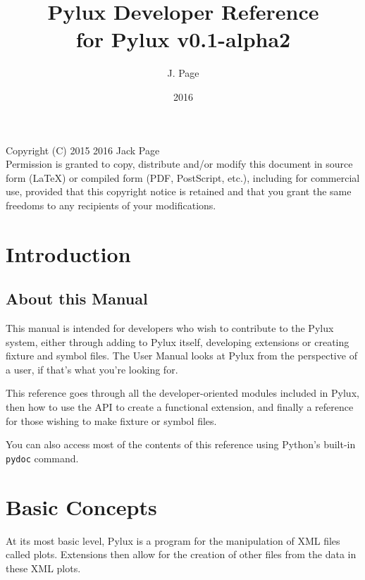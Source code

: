 \documentclass[a4paper]{article}
\begin{document}
\title{Pylux Developer Reference \\ \large{for Pylux v0.1-alpha2}}
\author{J. Page}
\date{2016}
\maketitle
\vspace{1.0pt}
Copyright (C)  2015 2016 Jack Page \\
Permission is granted to copy, distribute and/or modify this document
in source form (LaTeX) or compiled form (PDF, PostScript, etc.), including 
for commercial use, provided that this copyright notice is retained and that 
you grant the same freedoms to any recipients of your modifications.
\tableofcontents
\newpage
\section{Introduction}
\subsection{About this Manual}
This manual is intended for developers who wish to contribute to the Pylux 
system, either through adding to Pylux itself, developing extensions or 
creating fixture and symbol files. The User Manual looks at Pylux from the 
perspective of a user, if that's what you're looking for.

This reference goes through all the developer-oriented modules included in 
Pylux, then how to use the API to create a functional extension, and finally 
a reference for those wishing to make fixture or symbol files.

You can also access most of the contents of this reference using Python's 
built-in \texttt{pydoc} command.

\section{Basic Concepts}
At its most basic level, Pylux is a program for the manipulation of XML files 
called plots. Extensions then allow for the creation of other files from the 
data in these XML plots.
\end{document}
